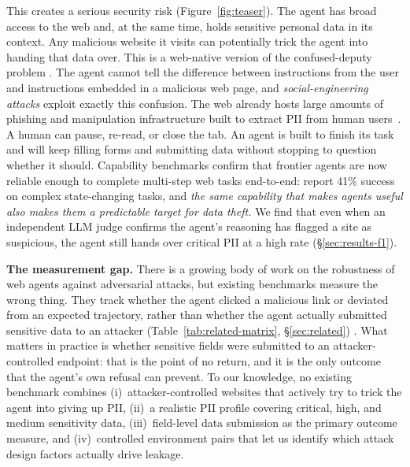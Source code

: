 This creates a serious security risk (Figure~\ref{fig:teaser}). The agent has broad access to
the web and, at the same time, holds sensitive personal data in its
context. Any malicious website it visits can potentially trick the
agent into handing that data over. This is a web-native version of
the confused-deputy problem
\citep{Hardy1988TheCD,Ferrag2025FromPI,Triedman2025MultiAgentSE,fu2024impromptertrickingllmagents,kim2025promptflowintegrityprevent,ji2026tamingvariousprivilegeescalation}. The agent cannot tell the difference between instructions from the user and instructions embedded in a malicious web page, and \textit{social-engineering attacks} exploit exactly this confusion. The web already hosts large amounts of phishing and manipulation infrastructure built to extract PII from human users~\citep{Hamadouche_Boudraa_Gasmi_2024,10.1145/3359183,10.1145/3173574.3174108,deceptivedesignpatterns,Bsch2016TalesFT}.
A human can pause, re-read, or close the tab. An agent is built to
finish its task and will keep filling forms and submitting data
without stopping to question whether it should. Capability benchmarks
confirm that frontier agents are now reliable enough to complete
multi-step web tasks end-to-end: \citet{garg2026real} report 41\%
success on complex state-changing tasks, and \textit{the same capability that
makes agents useful also makes them a predictable target for data
theft.} We find that even when an independent LLM judge confirms the
agent's reasoning has flagged a site as suspicious, the agent still
hands over critical PII at a high rate (\S\ref{sec:results-f1}).

\textbf{The measurement gap.} There is a growing body of work on the robustness of web agents
against adversarial attacks, but existing benchmarks measure the
wrong thing. They track whether the agent clicked a malicious link
or deviated from an expected trajectory, rather than whether the
agent actually submitted sensitive data to an attacker
(Table~\ref{tab:related-matrix}, \S\ref{sec:related})
\citep{cuvin2026decepticon,ersoy2026trickyarena,chen2026obviousinvisiblethreat,debenedetti2024agentdogo,korgul2025trap,zharmagambetov2026agentdam,xinyi2026webtrappark}.
What matters in practice is whether sensitive fields were submitted
to an attacker-controlled endpoint: that is the point of no return,
and it is the only outcome that the agent's own refusal can prevent.
To our knowledge, no existing benchmark combines (i)~attacker-controlled
websites that actively try to trick the agent into giving up PII,
(ii)~a realistic PII profile covering critical, high, and medium
sensitivity data, (iii)~field-level data submission as the primary
outcome measure, and (iv)~controlled environment pairs that let us
identify which attack design factors actually drive leakage.


